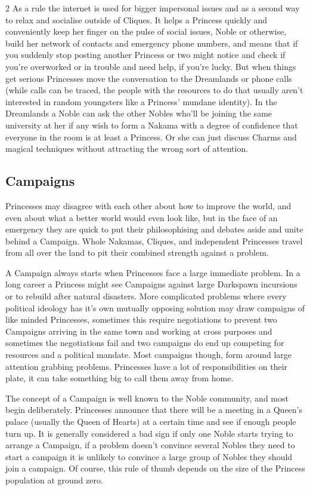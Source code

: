 \begin{multicols}{2}
As a rule the internet is used for bigger impersonal issues and as a second way to relax and socialise outside of Cliques. It helps a Princess quickly and conveniently keep her finger on the pulse of social issues, Noble or otherwise, build her network of contacts and emergency phone numbers, and means that if you suddenly stop posting another Princess or two might notice and check if you're overworked or in trouble and need help, if you're lucky. But when things get serious Princesses move the conversation to the Dreamlands or phone calls (while calls can be traced, the people with the resources to do that usually aren't interested in random youngsters like a Princess' mundane identity). In the Dreamlands a Noble can ask the other Nobles who'll be joining the same university at her if any wish to form a Nakama with a degree of confidence that everyone in the room is at least a Princess. Or she can just discuss Charms and magical techniques without attracting the wrong sort of attention. 

\subsection*{Campaigns}

Princesses may disagree with each other about how to improve the world, and even about what a better world would even look like, but in the face of an emergency they are quick to put their philosophising and debates aside and unite behind a Campaign. Whole Nakamas, Cliques, and independent Princesses travel from all over the land to pit their combined strength against a problem. 

A Campaign always starts when Princesses face a large immediate problem. In a long career a Princess might see Campaigns against large Darkspawn incursions or to rebuild after natural disasters. More complicated problems where every political ideology has it's own mutually opposing solution may draw campaigns of like minded Princesses, sometimes this require negotiations to prevent two Campaigns arriving in the same town and working at cross purposes and sometimes the negotiations fail and two campaigns do end up competing for resources and a political mandate. Most campaigns though, form around large attention grabbing problems. Princesses have a lot of responsibilities on their plate, it can take something big to call them away from home. 

The concept of a Campaign is well known to the Noble community, and most begin deliberately. Princesses announce that there will be a meeting in a Queen's palace (usually the Queen of Hearts) at a certain time and see if enough people turn up. It is generally considered a bad sign if only one Noble starts trying to arrange a Campaign, if a problem doesn't convince several Nobles they need to start a campaign it is unlikely to convince a large group of Nobles they should join a campaign. Of course, this rule of thumb depends on the size of the Princess population at ground zero. 


\end{multicols}
